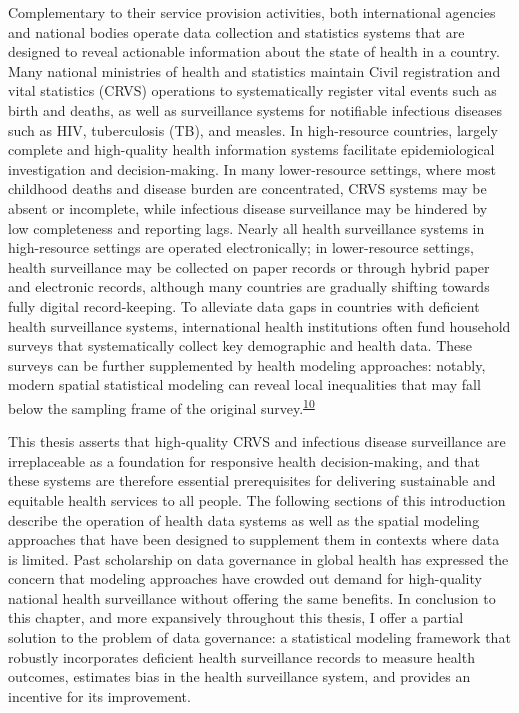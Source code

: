 \documentclass[
]{article}
\begin{document}
Complementary to their service provision activities, both international agencies and national bodies operate data collection and statistics systems that are designed to reveal actionable information about the state of health in a country. Many national ministries of health and statistics maintain Civil registration and vital statistics (CRVS) operations to systematically register vital events such as birth and deaths, as well as surveillance systems for notifiable infectious diseases such as HIV, tuberculosis (TB), and measles. In high-resource countries, largely complete and high-quality health information systems facilitate epidemiological investigation and decision-making. In many lower-resource settings, where most childhood deaths and disease burden are concentrated, CRVS systems may be absent or incomplete, while infectious disease surveillance may be hindered by low completeness and reporting lags. Nearly all health surveillance systems in high-resource settings are operated electronically; in lower-resource settings, health surveillance may be collected on paper records or through hybrid paper and electronic records, although many countries are gradually shifting towards fully digital record-keeping. To alleviate data gaps in countries with deficient health surveillance systems, international health institutions often fund household surveys that systematically collect key demographic and health data. These surveys can be further supplemented by health modeling approaches: notably, modern spatial statistical modeling can reveal local inequalities that may fall below the sampling frame of the original survey.\textsuperscript{\protect\hyperlink{ref-Diggle2016}{10}}

This thesis asserts that high-quality CRVS and infectious disease surveillance are irreplaceable as a foundation for responsive health decision-making, and that these systems are therefore essential prerequisites for delivering sustainable and equitable health services to all people. The following sections of this introduction describe the operation of health data systems as well as the spatial modeling approaches that have been designed to supplement them in contexts where data is limited. Past scholarship on data governance in global health has expressed the concern that modeling approaches have crowded out demand for high-quality national health surveillance without offering the same benefits. In conclusion to this chapter, and more expansively throughout this thesis, I offer a partial solution to the problem of data governance: a statistical modeling framework that robustly incorporates deficient health surveillance records to measure health outcomes, estimates bias in the health surveillance system, and provides an incentive for its improvement.
\end{document}
